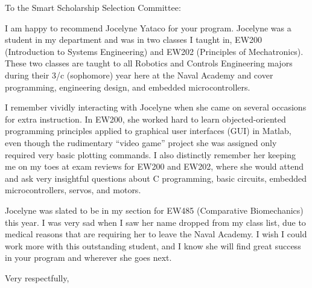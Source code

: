 \documentclass[12pt]{wrceletter}
\date{\today}
\begin{document}
\begin{letter}{%
}

\opening{To the Smart Scholarship Selection Committee:}
\raggedright %
\setlength{\parindent}{15pt} %

I am happy to recommend Jocelyne Yataco for your program. Jocelyne was a student in my department and was in two classes I taught in, EW200 (Introduction to Systems Engineering) and EW202 (Principles of Mechatronics). These two classes are taught to all Robotics and Controls Engineering majors during their 3/c (sophomore) year here at the Naval Academy and cover programming, engineering design, and embedded microcontrollers.  

I remember vividly interacting with Jocelyne when she came on several occasions for extra instruction. In EW200, she worked hard to learn objected-oriented programming principles applied to graphical user interfaces (GUI) in Matlab, even though the rudimentary ``video game'' project she was assigned only required very basic plotting commands. I also distinctly remember her keeping me on my toes at exam reviews for EW200 and EW202, where she would attend and ask very insightful questions about C programming, basic circuits, embedded microcontrollers, servos, and motors. 

Jocelyne was slated to be in my section for EW485 (Comparative Biomechanics) this year. I was very sad when I saw her name dropped from my class list, due to medical reasons that are requiring her to leave the Naval Academy. I wish I could work more with this outstanding student, and I know she will find great success in your program and wherever she goes next. 



\closing{Very respectfully,} %

\end{letter}
\end{document}
